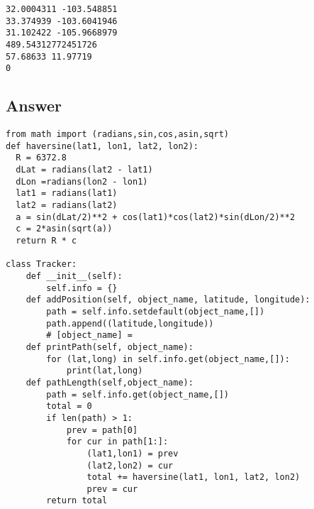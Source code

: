 \documentclass[11pt]{article}
\begin{document}
\begin{verbatim}
32.0004311 -103.548851
33.374939 -103.6041946
31.102422 -105.9668979
489.54312772451726
57.68633 11.97719
0
\end{verbatim}

\subsection{Answer}
\label{sec:org8ed4973}

\begin{verbatim}
from math import (radians,sin,cos,asin,sqrt)
def haversine(lat1, lon1, lat2, lon2):
  R = 6372.8
  dLat = radians(lat2 - lat1)
  dLon =radians(lon2 - lon1)
  lat1 = radians(lat1)
  lat2 = radians(lat2)
  a = sin(dLat/2)**2 + cos(lat1)*cos(lat2)*sin(dLon/2)**2
  c = 2*asin(sqrt(a))
  return R * c

class Tracker:
    def __init__(self):
        self.info = {}
    def addPosition(self, object_name, latitude, longitude):
        path = self.info.setdefault(object_name,[])
        path.append((latitude,longitude))
        # [object_name] = 
    def printPath(self, object_name):
        for (lat,long) in self.info.get(object_name,[]):
            print(lat,long)
    def pathLength(self,object_name):
        path = self.info.get(object_name,[])
        total = 0
        if len(path) > 1:
            prev = path[0]
            for cur in path[1:]:
                (lat1,lon1) = prev
                (lat2,lon2) = cur
                total += haversine(lat1, lon1, lat2, lon2)
                prev = cur
        return total
\end{verbatim}
\end{document}

